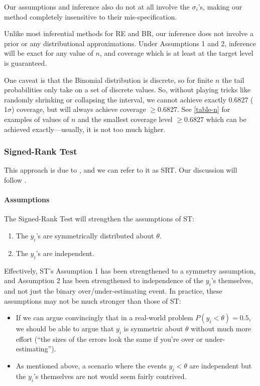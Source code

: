 \documentclass[12pt]{article}
\begin{document}
Our assumptions and inference also do not at all involve the $\sigma_i$'s, making our method completely insensitive to their mis-specification.

Unlike most inferential methods for RE and BR, our inference does not involve a prior or any distributional approximations. Under Assumptions 1 and 2, inference will be exact for any value of $n$, and coverage which is at least at the target level is guaranteed.

One caveat is that the Binomial distribution is discrete, so for finite $n$ the tail probabilities only take on a set of discrete values. So, without playing tricks like randomly shrinking or collapsing the interval, we cannot achieve exactly 0.6827 ($1\sigma$) coverage, but will always achieve coverage $\geq 0.6827$. See \ref{table-n} for examples of values of $n$ and the smallest coverage level $\geq0.6827$ which can be achieved exactly---usually, it is not too much higher.

\subsubsection{Signed-Rank Test}\label{signed-rank-test}

This approach is due to \citet{wilcoxon1945individual}, and we can refer to it as SRT. Our discussion will follow \citet[Section 5.7]{conover1999practical}.

\paragraph{Assumptions}\label{assumptions-4}

The Signed-Rank Test will strengthen the assumptions of ST:

\begin{enumerate}
\item
  The $y_i$'s are symmetrically distributed about $\theta$.
\item
  The $y_i$'s are independent.
\end{enumerate}

Effectively, ST's Assumption 1 has been strengthened to a symmetry assumption, and Assumption 2 has been strengthened to independence of the $y_i$'s themselves, and not just the binary over/under-estimating event. In practice, these assumptions may not be much stronger than those of ST:

\begin{itemize}

\item
  If we can argue convincingly that in a real-world problem $P(y_i<\theta)=0.5$, we should be able to argue that $y_i$ is symmetric about $\theta$ without much more effort (``the sizes of the errors look the same if you're over or under-estimating'').
\item
  As mentioned above, a scenario where the events $y_i<\theta$ are independent but the $y_i$'s themselves are not would seem fairly contrived.
\end{itemize}
\end{document}
